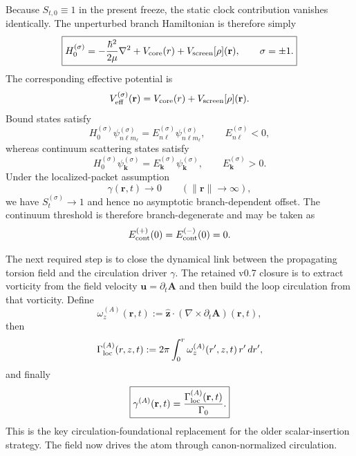 \documentclass[11pt,a4paper]{article}
\begin{document}
Because $S_{t,0}\equiv 1$ in the present freeze, the static clock contribution vanishes identically. The unperturbed branch Hamiltonian is therefore simply
\begin{equation}
\label{eq:H0sigma}
\boxed{
H_0^{(\sigma)}
=
-\frac{\hbar^2}{2\mu}\nabla^2
+
V_{\rm core}(r)
+
V_{\rm screen}[\rho](\mathbf r),
\qquad
\sigma=\pm 1.
}
\end{equation}
The corresponding effective potential is
\begin{equation}
\label{eq:Veffsigma}
V_{\rm eff}^{(\sigma)}(\mathbf r)
=
V_{\rm core}(r)
+
V_{\rm screen}[\rho](\mathbf r).
\end{equation}
Bound states satisfy
\begin{equation}
\label{eq:boundstates}
H_0^{(\sigma)}\psi_{n\ell m_\ell}^{(\sigma)}
=
E_{n\ell}^{(\sigma)}\psi_{n\ell m_\ell}^{(\sigma)},
\qquad
E_{n\ell}^{(\sigma)}<0,
\end{equation}
whereas continuum scattering states satisfy
\begin{equation}
\label{eq:continuumstates}
H_0^{(\sigma)}\psi_{\mathbf k}^{(\sigma)}
=
E_{\mathbf k}^{(\sigma)}\psi_{\mathbf k}^{(\sigma)},
\qquad
E_{\mathbf k}^{(\sigma)}>0.
\end{equation}
Under the localized-packet assumption
\begin{equation}
\label{eq:gammaAsymptotic}
\gamma(\mathbf r,t)\to 0 \qquad (\lVert \mathbf r\rVert\to\infty),
\end{equation}
we have $S_t^{(\sigma)}\to 1$ and hence no asymptotic branch-dependent offset. The continuum threshold is therefore branch-degenerate and may be taken as
\begin{equation}
\label{eq:continuum-threshold}
E_{\rm cont}^{(+)}(0)=E_{\rm cont}^{(-)}(0)=0.
\end{equation}

The next required step is to close the dynamical link between the propagating torsion field and the circulation driver $\gamma$. The retained v0.7 closure is to extract vorticity from the field velocity $\mathbf u=\partial_t\mathbf A$ and then build the loop circulation from that vorticity. Define
\begin{equation}
\label{eq:omegaA}
\omega_z^{(A)}(\mathbf r,t)
:=
\hat{\mathbf z}\cdot\left(\nabla\times \partial_t \mathbf A\right)(\mathbf r,t),
\end{equation}
then
\begin{equation}
\label{eq:GammaA}
\Gamma_{\rm loc}^{(A)}(r,z,t)
:=
2\pi\int_0^r \omega_z^{(A)}(r',z,t)\,r'\,dr',
\end{equation}
and finally
\begin{equation}
\label{eq:gammaA}
\boxed{
\gamma^{(A)}(\mathbf r,t)
=
\frac{\Gamma_{\rm loc}^{(A)}(\mathbf r,t)}{\Gamma_0}.
}
\end{equation}
This is the key circulation-foundational replacement for the older scalar-insertion strategy. The field now drives the atom through canon-normalized circulation.
\end{document}
